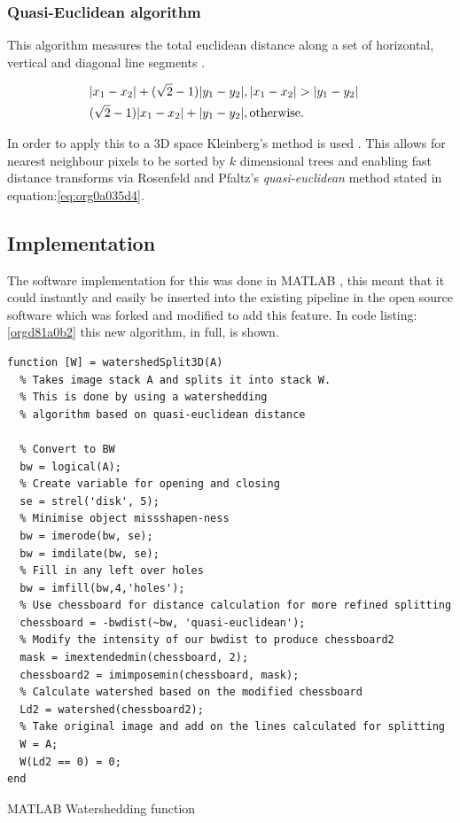 \documentclass[11pt]{report}
\begin{document}
\subsubsection{Quasi-Euclidean algorithm}
\label{sec:org2d5b820}

This algorithm measures the total euclidean distance along a set of horizontal, vertical and diagonal
line segments \cite{Pfaltz1966}.

\begin{align}
\label{eq:org0a035d4}
  &\begin{aligned}
&|x_1-x_2|+(\sqrt{2}-1)|y_1-y_2|, |x_1-x_2| > |y_1-y_2| \\
      &(\sqrt{2}-1)|x_1-x_2| + |y_1-y_2|, \textup{otherwise.}
  \end{aligned}
\end{align}

In order to apply this to a 3D space Kleinberg's method is used  \cite{Kleinberg1997}. This allows for nearest neighbour pixels to be sorted by \(k\) dimensional trees
and enabling fast distance transforms via Rosenfeld and Pfaltz's \emph{quasi-euclidean} method stated in equation:\ref{eq:org0a035d4}.

\subsection{Implementation}
\label{sec:orga4ee9f8}

The software implementation for this was done in MATLAB \cite{MATHWORKS2017}, this meant that it could instantly and easily be inserted into the existing pipeline in the open source software which was forked and modified to add this feature. In code listing:\ref{orgd81a0b2} this new algorithm, in full, is shown.

\begin{listing}[htbp]
\begin{verbatim}
function [W] = watershedSplit3D(A)
  % Takes image stack A and splits it into stack W.
  % This is done by using a watershedding
  % algorithm based on quasi-euclidean distance

  % Convert to BW
  bw = logical(A);
  % Create variable for opening and closing
  se = strel('disk', 5);
  % Minimise object missshapen-ness
  bw = imerode(bw, se);
  bw = imdilate(bw, se);
  % Fill in any left over holes
  bw = imfill(bw,4,'holes');
  % Use chessboard for distance calculation for more refined splitting
  chessboard = -bwdist(~bw, 'quasi-euclidean');
  % Modify the intensity of our bwdist to produce chessboard2
  mask = imextendedmin(chessboard, 2);
  chessboard2 = imimposemin(chessboard, mask);
  % Calculate watershed based on the modified chessboard
  Ld2 = watershed(chessboard2);
  % Take original image and add on the lines calculated for splitting
  W = A;
  W(Ld2 == 0) = 0;
end
\end{verbatim}
\caption{\label{orgd81a0b2}
MATLAB Watershedding function}
\end{listing}
\end{document}
